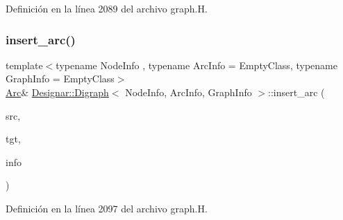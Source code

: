 Definición en la línea 2089 del archivo graph.\+H.

\mbox{\label{class_designar_1_1_digraph_a58d7f0e13a9e42cbc9e28683b527ca72}} 
\subsubsection{\texorpdfstring{insert\+\_\+arc()}{insert\_arc()}\hspace{0.1cm}{\footnotesize\ttfamily [3/4]}}
{\footnotesize\ttfamily template$<$typename Node\+Info , typename Arc\+Info  = Empty\+Class, typename Graph\+Info  = Empty\+Class$>$ \\
\hyperlink{class_designar_1_1_digraph_a0ceb278671f2a535c00fddccdeafd69f}{Arc}\& \hyperlink{class_designar_1_1_digraph}{Designar\+::\+Digraph}$<$ Node\+Info, Arc\+Info, Graph\+Info $>$\+::insert\+\_\+arc (\begin{DoxyParamCaption}\item[{\hyperlink{class_designar_1_1_digraph_a4dc921c41a480b7946a04170e997d8ae}{Node} \&}]{src,  }\item[{\hyperlink{class_designar_1_1_digraph_a4dc921c41a480b7946a04170e997d8ae}{Node} \&}]{tgt,  }\item[{const Arc\+Info \&}]{info }\end{DoxyParamCaption})\hspace{0.3cm}{\ttfamily [inline]}}



Definición en la línea 2097 del archivo graph.\+H.

\mbox{\label{class_designar_1_1_digraph_a9e46012a65696859c131d0bc5e096f55}} 

